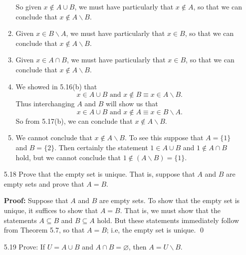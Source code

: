 \begin{enumerate}
\begin{enumerate}
               So given $x \notin A \cup B$, we must have particularly that
               $x \notin A$, so that we can conclude that
               $x \notin A{\backslash}B$.
         \item Given $x \in B{\backslash}A$, we must have particularly that
               $x \in B$, so that we can conclude that $x\notin A{\backslash}B$.
         \item Given $x \in A \cap B$, we must have particularly that
               $x \in B$, so that we can conclude that $x\notin A{\backslash}B$.
         \item We showed in 5.16(b) that
               $$x \in A \cup B \text{ and } x \notin B \equiv
                 x \in A{\backslash}B.$$
               Thus interchanging $A$ and $B$ will show us that
               $$x \in A \cup B \text{ and } x \notin A \equiv
                 x \in B{\backslash}A.$$
               So from 5.17(b), we can conclude that $x\notin A{\backslash}B$.
         \item We cannot conclude that $x \notin A{\backslash}B$. To see this
               suppose that $A = \{1\}$ and $B = \{2\}$. Then certainly the
               statement $1 \in A \cup B$ and $1 \notin A \cap B$ hold, but
               we cannot conclude that $1 \notin (A{\backslash}B) = \{1\}$.
      \end{enumerate}
   \item[5.18] Prove that the empty set is unique. That is, suppose that $A$ and
               $B$ are empty sets and prove that $A = B$.
               
      \textbf{Proof:} Suppose that $A$ and $B$ are empty sets. To show that the
      empty set is unique, it suffices to show that $A = B$. That is, we must
      show that the statements $A \subseteq B$ and $B \subseteq A$ hold. But
      these statements immediately follow from Theorem 5.7, so that $A = B$;
      i.e, the empty set is unique. \qed
   \item[5.19] Prove: If $U = A \cup B$ and $A \cap B = \varnothing$, then
               $A = U{\backslash}B$.
               

\end{enumerate}
